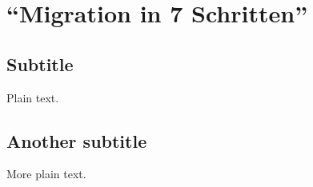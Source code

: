\section{"`Migration in 7 Schritten"'}

\subsection{Subtitle}

Plain text.

\subsection{Another subtitle}

More plain text.
